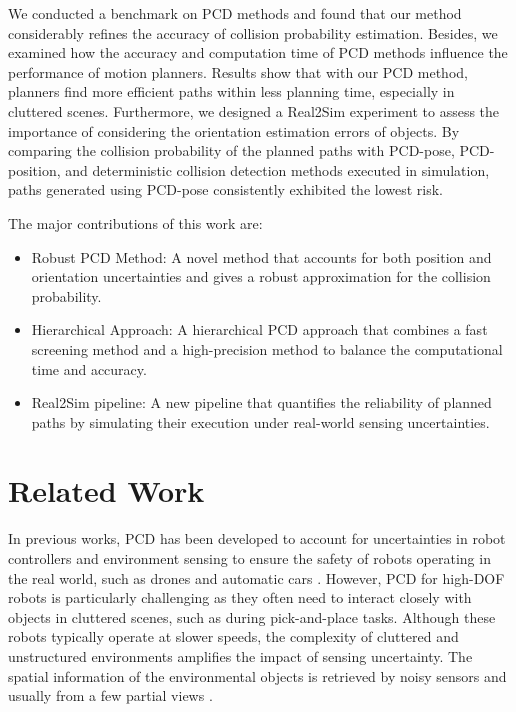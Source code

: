 \documentclass[conference]{IEEEtran}
\begin{document}
We conducted a benchmark on PCD methods and found that our method considerably refines the accuracy of collision probability estimation. Besides, we examined how the accuracy and computation time of PCD methods influence the performance of motion planners. Results show that with our PCD method, planners find more efficient paths within less planning time, especially in cluttered scenes. Furthermore, we designed a Real2Sim experiment to assess the importance of considering the orientation estimation errors of objects. By comparing the collision probability of the planned paths with PCD-pose, PCD-position, and deterministic collision detection methods executed in simulation, paths generated using PCD-pose consistently exhibited the lowest risk.

The major contributions of this work are:
\begin{itemize}
\item Robust PCD Method: A novel method that accounts for both position and orientation uncertainties and gives a robust approximation for the collision probability. 
\item Hierarchical Approach: A hierarchical PCD approach that combines a fast screening method and a high-precision method to balance the computational time and accuracy. 
\item Real2Sim pipeline: A new pipeline that quantifies the reliability of planned paths by simulating their execution under real-world sensing uncertainties. 
\end{itemize}

\section{Related Work}
In previous works, PCD has been developed to account for uncertainties in robot controllers and environment sensing to ensure the safety of robots operating in the real world, such as drones and automatic cars \cite{zhu2019chance, dawson2020provably}. However, PCD for high-DOF robots is particularly challenging as they often need to interact closely with objects in cluttered scenes, such as during pick-and-place tasks. Although these robots typically operate at slower speeds, the complexity of cluttered and unstructured environments amplifies the impact of sensing uncertainty. The spatial information of the environmental objects is retrieved by noisy sensors and usually from a few partial views \cite{burns2007sampling, pan2017probabilistic}. 
\end{document}
